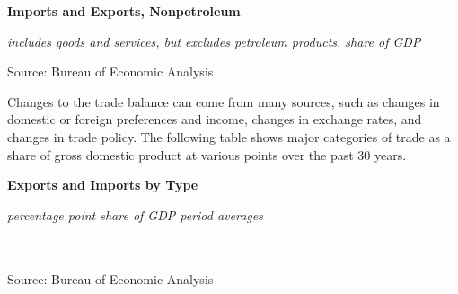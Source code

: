 \documentclass{report}
\makeatletter
\newcommand{\tbllink}[1]{\href{https://raw.githubusercontent.com/bdecon/US-chartbook/master/chartbook/data/#1}{\faTable}}
\newcommand*\short[1]{\expandafter\@gobbletwo\number\numexpr#1\relax}
\newcommand{\dateaxisticks}{
		date coordinates in=x, axis line style={draw=none},
		xmax={2020-10-01},
		max space between ticks=40,	    
		xtick={{1990-01-01}, {1992-01-01}, {1994-01-01}, 
			{1996-01-01}, {1998-01-01}, {2000-01-01}, 
			{2002-01-01}, {2004-01-01}, {2006-01-01},
			{2008-01-01}, {2010-01-01}, {2012-01-01}, {2014-01-01},
		    {2016-01-01}, {2018-01-01}, {2020-01-01}},
		minor xtick={{1989-01-01}, {1991-01-01}, {1993-01-01},
			{1995-01-01}, {1997-01-01}, {1999-01-01}, 
			{2001-01-01}, {2003-01-01}, {2005-01-01}, {2007-01-01},
		    {2009-01-01}, {2011-01-01}, {2013-01-01}, {2015-01-01},
		    {2017-01-01}, {2019-01-01}},
		enlarge y limits={0.06}, enlarge x limits={0.01},
		}
\newcommand{\bbar}[2]{extra #1 ticks = {{#2}}, extra #1 tick labels = ,
		extra #1 tick style = {grid=major, grid style={thick, black!25}},}
\newcommand{\thickline}[4]{\addplot[ultra thick, no markers, color=#1] 
		table [x=#2, y=#3, col sep=comma] {#4};	}
\newcommand{\rbars}{
		\fill[color=black!10] (axis cs:{1990-07-01},\pgfkeysvalueof{/pgfplots/ymin}) rectangle 
			(axis cs:{1991-03-01}, \pgfkeysvalueof{/pgfplots/ymax});
		\fill[color=black!10] (axis cs:{2007-12-01},\pgfkeysvalueof{/pgfplots/ymin}) rectangle 
			(axis cs:{2009-07-01}, \pgfkeysvalueof{/pgfplots/ymax});
		\fill[color=black!10] (axis cs:{2001-03-01},\pgfkeysvalueof{/pgfplots/ymin}) rectangle 
			(axis cs:{2001-11-01}, \pgfkeysvalueof{/pgfplots/ymax});
		\fill[color=black!10] (axis cs:{2020-02-01},\pgfkeysvalueof{/pgfplots/ymin}) rectangle 
			(axis cs:{2020-10-01}, \pgfkeysvalueof{/pgfplots/ymax});}
\makeatother
\begin{document}
{{{{{{\begin{minipage}{0.76\textwidth}
\vspace{8mm}

\small 

\vspace{3mm}

\normalsize \textbf{Imports and Exports, Nonpetroleum}

\footnotesize{\textit{includes goods and services, but excludes petroleum products, share of GDP}}

\hspace*{-2mm} 

\footnotesize{Source: Bureau of Economic Analysis} \hfill \tbllink{eximgdp.csv}
\end{minipage}
\newpage
\begin{minipage}{0.76\textwidth}
\small Changes to the trade balance can come from many sources, such as changes in domestic or foreign preferences and income, changes in exchange rates, and changes in trade policy. The following table shows major categories of trade as a share of gross domestic product at various points over the past 30 years. 
\end{minipage}

\normalsize \textbf{Exports and Imports by Type}\\
\footnotesize{\textit{percentage point share of GDP \hspace{40mm} period averages}\\ 
 \setlength{\tabcolsep}{3.1pt} \color{black!90}
		{\renewcommand{\arraystretch}{1.55}
		 \begin{tabular}{p{42mm} R{7.1mm} R{7.1mm} R{7.1mm} R{7.1mm} R{7.1mm} 
		   R{7.1mm} R{7.1mm} R{7.1mm} }
			 \hline
		\end{tabular}}	\\
		
\vspace{-2mm}
\footnotesize{Source: Bureau of Economic Analysis}}

}}}}}}
\end{document}
